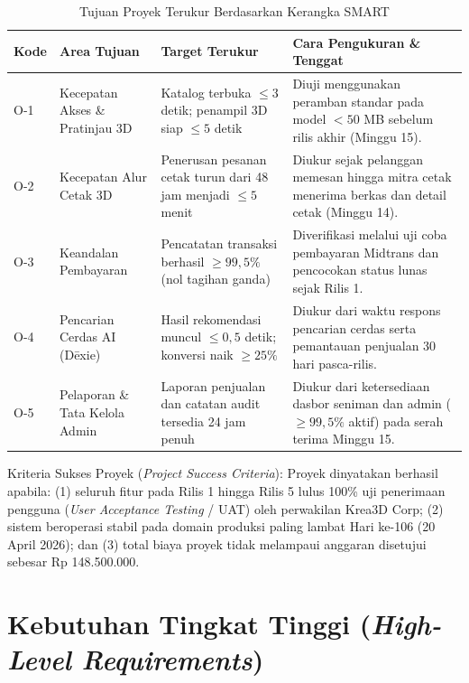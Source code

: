 \documentclass[11pt,a4paper]{article}
\newcommand{\thdr}[1]{\centering\arraybackslash\textbf{#1}}
\renewcommand{\arraystretch}{1.26}
\begin{document}
\begin{table}[H]
\centering
{\renewcommand{\arraystretch}{1.15}\small
\caption{Tujuan Proyek Terukur Berdasarkan Kerangka SMART}
\begin{tabularx}{\textwidth}{| C{1.0cm} | L{3.3cm} | L{3.6cm} | Y |}
\hline
{} \thdr{Kode} & \thdr{Area Tujuan} & \thdr{Target Terukur} & \thdr{Cara Pengukuran \& Tenggat} \\
\hline
O-1 & Kecepatan Akses \& Pratinjau 3D & Katalog terbuka $\le 3$ detik; penampil 3D siap $\le 5$ detik & Diuji menggunakan peramban standar pada model $< 50$ MB sebelum rilis akhir (Minggu 15). \\
\hline
O-2 & Kecepatan Alur Cetak 3D & Penerusan pesanan cetak turun dari 48 jam menjadi $\le 5$ menit & Diukur sejak pelanggan memesan hingga mitra cetak menerima berkas dan detail cetak (Minggu 14). \\
\hline
O-3 & Keandalan Pembayaran & Pencatatan transaksi berhasil $\ge 99,5\%$ (nol tagihan ganda) & Diverifikasi melalui uji coba pembayaran Midtrans dan pencocokan status lunas sejak Rilis 1. \\
\hline
O-4 & Pencarian Cerdas AI (D\={e}xie) & Hasil rekomendasi muncul $\le 0,5$ detik; konversi naik $\ge 25\%$ & Diukur dari waktu respons pencarian cerdas serta pemantauan penjualan 30 hari pasca-rilis. \\
\hline
O-5 & Pelaporan \& Tata Kelola Admin & Laporan penjualan dan catatan audit tersedia 24 jam penuh & Diukur dari ketersediaan dasbor seniman dan admin ($\ge 99,5\%$ aktif) pada serah terima Minggu 15. \\
\hline
\end{tabularx}}
\end{table}

Kriteria Sukses Proyek (\textit{Project Success Criteria}):
Proyek dinyatakan berhasil apabila: (1) seluruh fitur pada Rilis 1 hingga Rilis 5 lulus 100\% uji penerimaan pengguna (\textit{User Acceptance Testing} / UAT) oleh perwakilan Krea3D Corp; (2) sistem beroperasi stabil pada domain produksi paling lambat Hari ke-106 (20 April 2026); dan (3) total biaya proyek tidak melampaui anggaran disetujui sebesar Rp 148.500.000.

\clearpage

\section{Kebutuhan Tingkat Tinggi (\textit{High-Level Requirements})}
\end{document}

